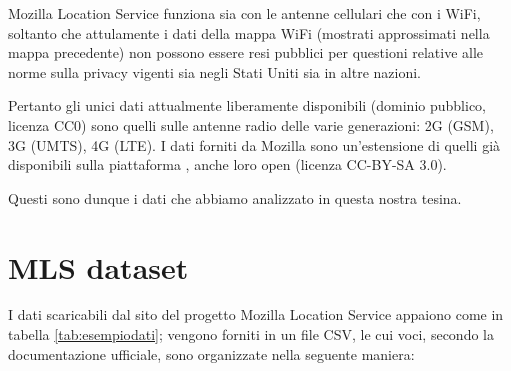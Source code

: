 Mozilla Location Service funziona sia con le antenne cellulari che con i WiFi, soltanto che attulamente i dati della mappa WiFi (mostrati approssimati nella mappa precedente) non possono essere resi pubblici per questioni relative alle norme sulla privacy vigenti sia negli Stati Uniti sia in altre nazioni.

Pertanto gli unici dati attualmente liberamente disponibili (dominio pubblico, licenza CC0) sono quelli sulle antenne radio delle varie generazioni: 2G (GSM), 3G (UMTS), 4G (LTE).
I dati forniti da Mozilla sono un'estensione di quelli già disponibili sulla piattaforma , anche loro open (licenza CC-BY-SA 3.0).

Questi sono dunque i dati che abbiamo analizzato in questa nostra tesina.

\clearpage
\section{MLS dataset}
\label{sec:mls}
I dati scaricabili dal sito del progetto Mozilla Location Service appaiono come in tabella \ref{tab:esempiodati}; vengono forniti in un file CSV, le cui voci, secondo la documentazione ufficiale, sono organizzate nella seguente maniera:

